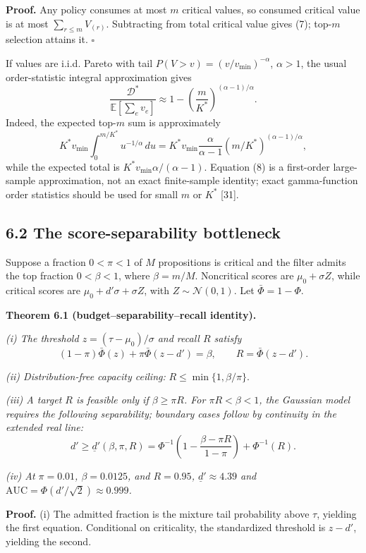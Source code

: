 \documentclass[
  11pt]{article}
\begin{document}
\textbf{Proof.} Any policy consumes at most \(m\) critical values, so consumed critical value is at most \(\sum_{r\leq m}V_{(r)}\). Subtracting from total critical value gives (7); top-\(m\) selection attains it. \(\square\)

If values are i.i.d. Pareto with tail \(P(V>v)=(v/v_{\min})^{-\alpha}\), \(\alpha>1\), the usual order-statistic integral approximation gives \[
\frac{\mathcal D^*}{\mathbb E[\sum_ev_e]}
\approx1-\left(\frac{m}{K^*}\right)^{(\alpha-1)/\alpha}.
\tag{8}
\] Indeed, the expected top-\(m\) sum is approximately \[
K^*v_{\min}\int_0^{m/K^*}u^{-1/\alpha}\,du
=K^*v_{\min}\frac{\alpha}{\alpha-1}(m/K^*)^{(\alpha-1)/\alpha},
\] while the expected total is \(K^*v_{\min}\alpha/(\alpha-1)\). Equation (8) is a first-order large-sample approximation, not an exact finite-sample identity; exact gamma-function order statistics should be used for small \(m\) or \(K^*\) {[}31{]}.

\subsection{6.2 The score-separability bottleneck}\label{the-score-separability-bottleneck}

Suppose a fraction \(0<\pi<1\) of \(M\) propositions is critical and the filter admits the top fraction \(0<\beta<1\), where \(\beta=m/M\). Noncritical scores are \(\mu_0+\sigma Z\), while critical scores are \(\mu_0+d'\sigma+\sigma Z\), with \(Z\sim\mathcal N(0,1)\). Let \(\bar\Phi=1-\Phi\).

\textbf{Theorem 6.1 (budget--separability--recall identity).}

\emph{(i) The threshold \(z=(\tau-\mu_0)/\sigma\) and recall \(R\) satisfy} \[
(1-\pi)\bar\Phi(z)+\pi\bar\Phi(z-d')=\beta,
\qquad R=\bar\Phi(z-d').
\tag{9}
\]

\emph{(ii) Distribution-free capacity ceiling:} \(R\leq\min\{1,\beta/\pi\}\).

\emph{(iii) A target \(R\) is feasible only if \(\beta\geq\pi R\). For \(\pi R<\beta<1\), the Gaussian model requires the following separability; boundary cases follow by continuity in the extended real line:} \[
d'\geq\underline d'(\beta,\pi,R)=
\Phi^{-1}\!\left(1-\frac{\beta-\pi R}{1-\pi}\right)+\Phi^{-1}(R).
\tag{10}
\]

\emph{(iv) At \(\pi=0.01\), \(\beta=0.0125\), and \(R=0.95\), \(\underline d'\approx4.39\) and \(\mathrm{AUC}=\Phi(d'/\sqrt2)\approx0.999\).}

\textbf{Proof.} (i) The admitted fraction is the mixture tail probability above \(\tau\), yielding the first equation. Conditional on criticality, the standardized threshold is \(z-d'\), yielding the second.
\end{document}

